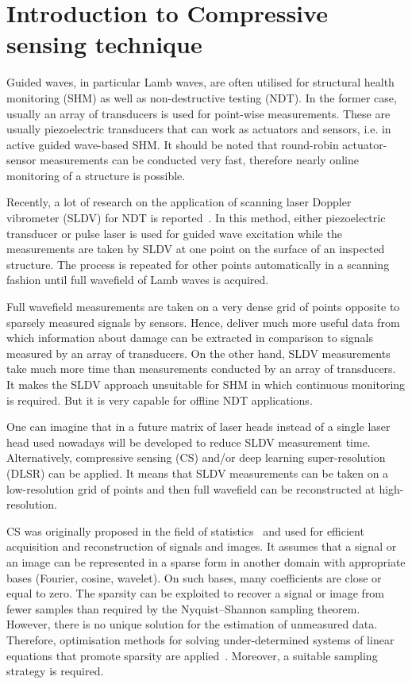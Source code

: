 \section{Introduction to Compressive sensing technique}
\label{sec61}
Guided waves, in particular Lamb waves, are often utilised for structural health monitoring (SHM) as well as non-destructive testing (NDT).
In the former case, usually an array of transducers is used for point-wise measurements.
These are usually piezoelectric transducers that can work as actuators and sensors, i.e. in active guided wave-based SHM.
It should be noted that round-robin actuator-sensor measurements can be conducted very fast, therefore nearly online monitoring of a structure is possible.

Recently, a lot of research on the application of scanning laser Doppler vibrometer (SLDV) for NDT is reported~\cite{Flynn2013,Kudela2015,Kudela2018d,Segers2021,Segers2022}. 
In this method, either piezoelectric transducer or pulse laser is used for guided wave excitation while the measurements are taken by SLDV at one point on the surface of an inspected structure.
The process is repeated for other points automatically in a scanning fashion until full wavefield of Lamb waves is acquired.

Full wavefield measurements are taken on a very dense grid of points opposite to sparsely measured signals by sensors.
Hence, deliver much more useful data from which information about damage can be extracted in comparison to signals measured by an array of transducers.
On the other hand, SLDV measurements take much more time than measurements conducted by an array of transducers.
It makes the SLDV approach unsuitable for SHM in which continuous monitoring is required.
But it is very capable for offline NDT applications.

One can imagine that in a future matrix of laser heads instead of a single laser head used nowadays will be developed to reduce SLDV measurement time.
Alternatively, compressive sensing (CS) and/or deep learning super-resolution (DLSR) can be applied.
It means that SLDV measurements can be taken on a low-resolution grid of points and then full wavefield can be reconstructed at high-resolution.

CS was originally proposed in the field of statistics~\cite{Candes2006,Donoho2006} and used for efficient acquisition and reconstruction of signals and images.
It assumes that a signal or an image can be represented in a sparse form in another domain with appropriate bases (Fourier, cosine, wavelet).
On such bases, many coefficients are close or equal to zero.
The sparsity can be exploited to recover a signal or image from fewer samples than required by the Nyquist–Shannon sampling theorem.
However, there is no unique solution for the estimation of unmeasured data.
Therefore, optimisation methods for solving under-determined systems of linear equations that promote sparsity are applied~\cite{Chen1998,VanEwoutBerg2008,VandenBerg2019}.
Moreover, a suitable sampling strategy is required.

